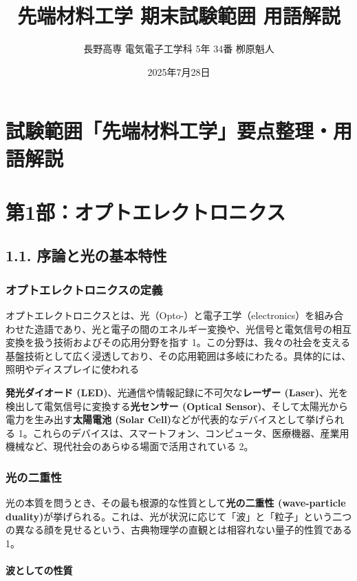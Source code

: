 \documentclass[11pt,a4paper]{ltjsarticle}
\title{先端材料工学 期末試験範囲 用語解説}
\author{長野高専 電気電子工学科 5年 34番 栁原魁人}
\date{2025年7月28日}
\begin{document}
\maketitle

\section*{試験範囲「先端材料工学」要点整理・用語解説}

\section*{第1部：オプトエレクトロニクス}

\subsection*{1.1. 序論と光の基本特性}

\subsubsection*{オプトエレクトロニクスの定義}

オプトエレクトロニクスとは、光（Opto-）と電子工学（electronics）を組み合わせた造語であり、光と電子の間のエネルギー変換や、光信号と電気信号の相互変換を扱う技術およびその応用分野を指す 1。この分野は、我々の社会を支える基盤技術として広く浸透しており、その応用範囲は多岐にわたる。具体的には、照明やディスプレイに使われる

\textbf{発光ダイオード (LED)}、光通信や情報記録に不可欠な\textbf{レーザー (Laser)}、光を検出して電気信号に変換する\textbf{光センサー (Optical Sensor)}、そして太陽光から電力を生み出す\textbf{太陽電池 (Solar Cell)}などが代表的なデバイスとして挙げられる 1。これらのデバイスは、スマートフォン、コンピュータ、医療機器、産業用機械など、現代社会のあらゆる場面で活用されている 2。

\subsubsection*{光の二重性}

光の本質を問うとき、その最も根源的な性質として\textbf{光の二重性 (wave-particle duality)}が挙げられる。これは、光が状況に応じて「波」と「粒子」という二つの異なる顔を見せるという、古典物理学の直観とは相容れない量子的性質である 1。

\paragraph{波としての性質}
\end{document}
